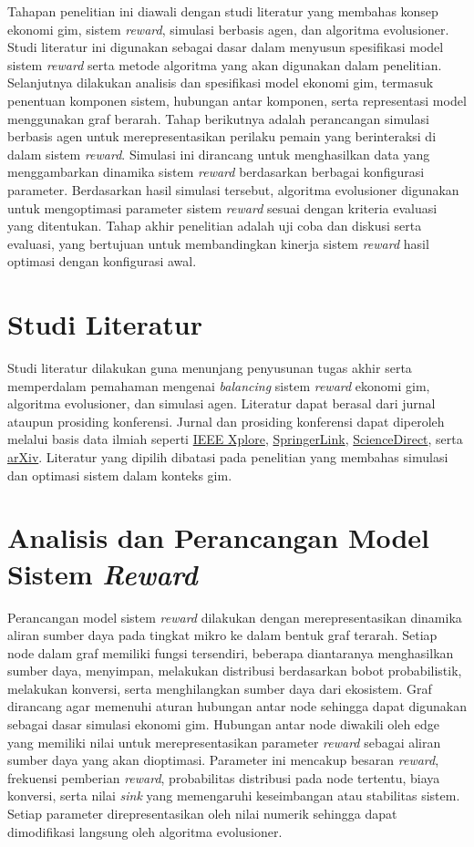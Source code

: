 Tahapan penelitian ini diawali dengan studi literatur yang membahas konsep ekonomi gim, sistem \textit{reward}, simulasi berbasis agen, dan algoritma evolusioner. Studi literatur ini digunakan sebagai dasar dalam menyusun spesifikasi model sistem \textit{reward} serta metode algoritma yang akan digunakan dalam penelitian. Selanjutnya dilakukan analisis dan spesifikasi model ekonomi gim, termasuk penentuan komponen sistem, hubungan antar komponen, serta representasi model menggunakan graf berarah. Tahap berikutnya adalah perancangan simulasi berbasis agen untuk merepresentasikan perilaku pemain yang berinteraksi di dalam sistem \textit{reward}. Simulasi ini dirancang untuk menghasilkan data yang menggambarkan dinamika sistem \textit{reward} berdasarkan berbagai konfigurasi parameter. Berdasarkan hasil simulasi tersebut, algoritma evolusioner digunakan untuk mengoptimasi parameter sistem \textit{reward} sesuai dengan kriteria evaluasi yang ditentukan. Tahap akhir penelitian adalah uji coba dan diskusi serta evaluasi, yang bertujuan untuk membandingkan kinerja sistem \textit{reward} hasil optimasi dengan konfigurasi awal.

\section{Studi Literatur}
Studi literatur dilakukan guna menunjang penyusunan tugas akhir serta memperdalam pemahaman mengenai \textit{balancing} sistem \textit{reward} ekonomi gim, algoritma evolusioner, dan simulasi agen. Literatur dapat berasal dari jurnal ataupun prosiding konferensi. Jurnal dan prosiding konferensi dapat diperoleh melalui basis data ilmiah seperti \href{https://ieeexplore.ieee.org/Xplore/home.jsp}{IEEE Xplore}, \href{https://link.springer.com/}{SpringerLink}, \href{https://www.sciencedirect.com/}{ScienceDirect}, serta \href{https://arxiv.org/}{arXiv}. Literatur yang dipilih dibatasi pada penelitian yang membahas simulasi dan optimasi sistem dalam konteks gim.


\section{Analisis dan Perancangan Model Sistem \textit{Reward}}
Perancangan model sistem \textit{reward} dilakukan dengan merepresentasikan dinamika aliran sumber daya pada tingkat mikro ke dalam bentuk graf terarah. Setiap node dalam graf memiliki fungsi tersendiri, beberapa diantaranya menghasilkan sumber daya, menyimpan, melakukan distribusi berdasarkan bobot probabilistik, melakukan konversi, serta menghilangkan sumber daya dari ekosistem. Graf dirancang agar memenuhi aturan hubungan antar node sehingga dapat digunakan sebagai dasar simulasi ekonomi gim. Hubungan antar node diwakili oleh edge yang memiliki nilai untuk merepresentasikan parameter \textit{reward} sebagai aliran sumber daya yang akan dioptimasi. Parameter ini mencakup besaran \textit{reward}, frekuensi pemberian \textit{reward}, probabilitas distribusi pada node tertentu, biaya konversi, serta nilai \textit{sink} yang memengaruhi keseimbangan atau stabilitas sistem. Setiap parameter direpresentasikan oleh nilai numerik sehingga dapat dimodifikasi langsung oleh algoritma evolusioner.

